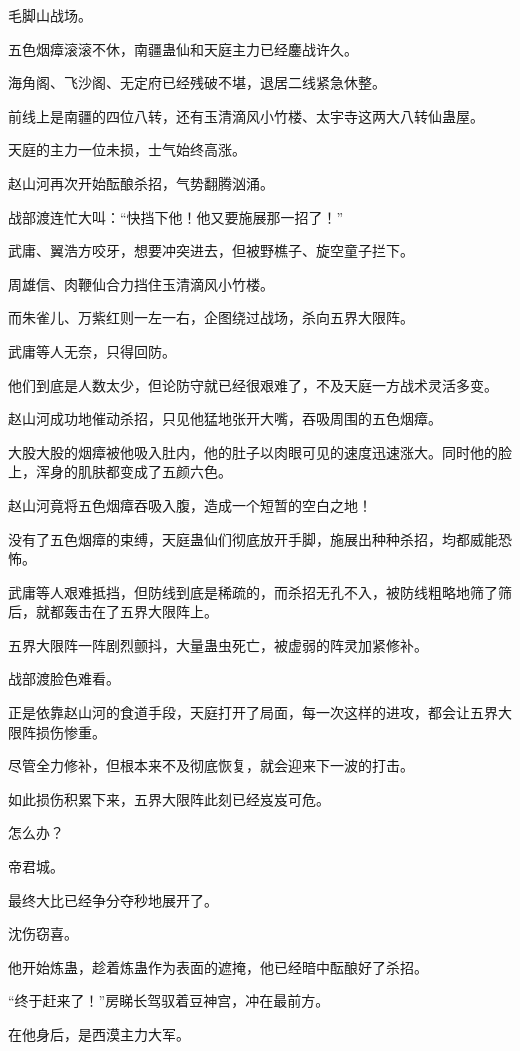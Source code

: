 \begin{this_body}
毛脚山战场。

五色烟瘴滚滚不休，南疆蛊仙和天庭主力已经鏖战许久。

海角阁、飞沙阁、无定府已经残破不堪，退居二线紧急休整。

前线上是南疆的四位八转，还有玉清滴风小竹楼、太宇寺这两大八转仙蛊屋。

天庭的主力一位未损，士气始终高涨。

赵山河再次开始酝酿杀招，气势翻腾汹涌。

战部渡连忙大叫：“快挡下他！他又要施展那一招了！”

武庸、翼浩方咬牙，想要冲突进去，但被野樵子、旋空童子拦下。

周雄信、肉鞭仙合力挡住玉清滴风小竹楼。

而朱雀儿、万紫红则一左一右，企图绕过战场，杀向五界大限阵。

武庸等人无奈，只得回防。

他们到底是人数太少，但论防守就已经很艰难了，不及天庭一方战术灵活多变。

赵山河成功地催动杀招，只见他猛地张开大嘴，吞吸周围的五色烟瘴。

大股大股的烟瘴被他吸入肚内，他的肚子以肉眼可见的速度迅速涨大。同时他的脸上，浑身的肌肤都变成了五颜六色。

赵山河竟将五色烟瘴吞吸入腹，造成一个短暂的空白之地！

没有了五色烟瘴的束缚，天庭蛊仙们彻底放开手脚，施展出种种杀招，均都威能恐怖。

武庸等人艰难抵挡，但防线到底是稀疏的，而杀招无孔不入，被防线粗略地筛了筛后，就都轰击在了五界大限阵上。

五界大限阵一阵剧烈颤抖，大量蛊虫死亡，被虚弱的阵灵加紧修补。

战部渡脸色难看。

正是依靠赵山河的食道手段，天庭打开了局面，每一次这样的进攻，都会让五界大限阵损伤惨重。

尽管全力修补，但根本来不及彻底恢复，就会迎来下一波的打击。

如此损伤积累下来，五界大限阵此刻已经岌岌可危。

怎么办？

帝君城。

最终大比已经争分夺秒地展开了。

沈伤窃喜。

他开始炼蛊，趁着炼蛊作为表面的遮掩，他已经暗中酝酿好了杀招。

“终于赶来了！”房睇长驾驭着豆神宫，冲在最前方。

在他身后，是西漠主力大军。


\end{this_body}
